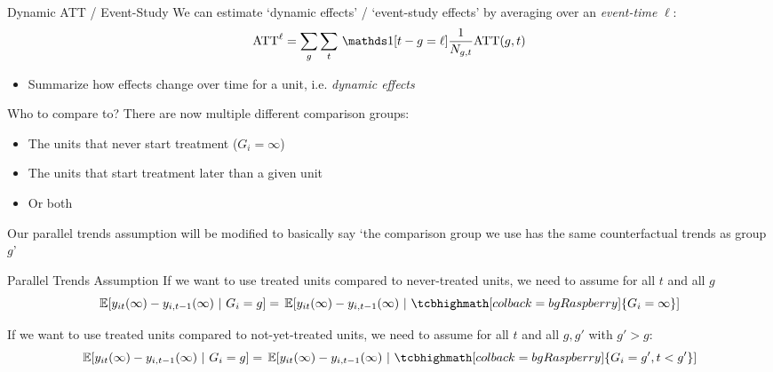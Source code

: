 \documentclass[aspectratio=169,t,11pt,table]{beamer}
\begin{document}
\begin{frame}{Dynamic ATT / Event-Study}
  We can estimate `dynamic effects' / `event-study effects' by averaging over an \emph{event-time} $\ell$:
  $$
    \text{ATT}^\ell = \sum_{g} \sum_{t} \one{t - g = \ell} \frac{1}{N_{g,t}} \text{ATT}(g,t)
  $$

  \bigskip
  \begin{itemize}
    \item Summarize how effects change over time for a unit, i.e. \emph{dynamic effects}
  \end{itemize}
\end{frame}

\begin{frame}{Who to compare to?}
  There are now multiple different comparison groups:
  \begin{itemize}
    \item The units that never start treatment ($G_i = \infty$)
    
    \item The units that start treatment later than a given unit
    
    \item Or both
  \end{itemize}

  \bigskip
  Our parallel trends assumption will be modified to basically say `the comparison group we use has the same counterfactual trends as group $g$'
\end{frame}


\begin{frame}{Parallel Trends Assumption}
  If we want to use treated units compared to never-treated units, we need to assume for all $t$ and all $g$
  $$
    \expec{y_{it}(\infty) - y_{i,t-1}(\infty)}{G_i = g} = 
    \expec{y_{it}(\infty) - y_{i,t-1}(\infty)}{ \tcbhighmath[colback = bgRaspberry]{G_i = \infty} }
  $$


  \pause
  \bigskip
  If we want to use treated units compared to not-yet-treated units, we need to assume for all $t$ and all $g, g'$ with $g' > g$:
  $$
    \expec{y_{it}(\infty) - y_{i,t-1}(\infty)}{G_i = g} = 
    \expec{y_{it}(\infty) - y_{i,t-1}(\infty)}{ \tcbhighmath[colback = bgRaspberry]{G_i = g', t < g'} }
  $$

\end{frame}
\end{document}
